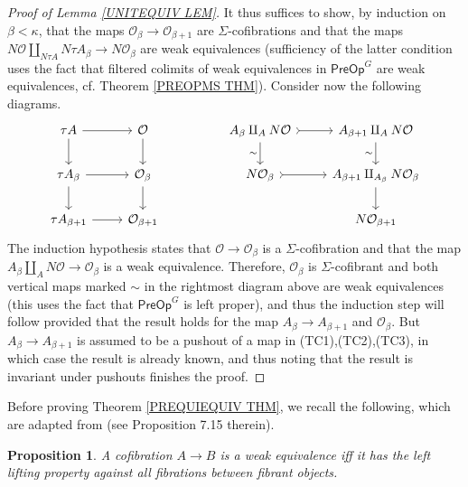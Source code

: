 \documentclass[a4paper,10pt
,draft
]{article}%
\numberwithin{equation}{section}
\numberwithin{figure}{section}
\newtheorem{proposition}[equation]{Proposition}%
\theoremstyle{definition} %
\newcommand{\1}{\ensuremath{\mathbbm 1}}%
\begin{document}
\begin{proof}[Proof of Lemma \ref{UNITEQUIV LEM}]
	It thus suffices to show, by induction on $\beta < \kappa$, 
	that the maps $\mathcal{O}_{\beta} \to \mathcal{O}_{\beta + 1}$ are $\Sigma$-cofibrations and that the maps 
	$N \mathcal{O} \amalg_{N \tau A} N \tau A_{\beta}
	\to 
	N \mathcal{O}_{\beta}$
	are weak equivalences
	(sufficiency of the latter condition uses the fact that 
	filtered colimits of weak equivalences in $\mathsf{PreOp}^G$ are weak equivalences, cf. Theorem \ref{PREOPMS THM}).
	Consider now the following diagrams.
	\[
	\begin{tikzcd}
	\tau A \ar{r} \ar{d} & \mathcal{O} \ar{d}
	&&
	A_{\beta} \amalg_{A} N \mathcal{O}
	\ar[>->]{r} \ar{d}[swap]{\sim} &
	A_{\beta+1} \amalg_{A} N \mathcal{O}
	\ar{d}[swap]{\sim}
	\\
	\tau A_{\beta} \ar{r} \ar{d} & \mathcal{O}_{\beta} \ar{d}
	&&
	N \mathcal{O}_{\beta} \ar[>->]{r} &
	A_{\beta+1} \amalg_{A_{\beta}} N \mathcal{O}_{\beta} \ar{d}
	\\
	\tau A_{\beta + 1} \ar{r} & \mathcal{O}_{\beta + 1}
	&&
	&
	N \mathcal{O}_{\beta+1}
	\end{tikzcd}
	\]
	The induction hypothesis states that
	$\mathcal{O} \to \mathcal{O}_{\beta}$ is a $\Sigma$-cofibration and that the map
	$A_{\beta} \amalg_A N \mathcal{O} \to \mathcal{O}_{\beta}$ is a weak equivalence.
	Therefore, $\mathcal{O}_{\beta}$ is $\Sigma$-cofibrant 
	and both vertical maps marked $\sim$ in the rightmost diagram above are weak equivalences 
	(this uses the fact that $\mathsf{PreOp}^G$ is left proper),
	and thus the induction step will follow provided that the result holds for
	the map $A_{\beta} \to A_{\beta + 1}$ and $\mathcal{O}_{\beta}$.
	But $A_{\beta} \to A_{\beta + 1}$ is assumed to be a pushout of a map in (TC1),(TC2),(TC3), 
	in which case the result is already known, and thus noting that the result is invariant under pushouts finishes the proof.
\end{proof}




Before proving Theorem \ref{PREQUIEQUIV THM}, 
we recall the following,
which are adapted from \cite{JT07} (see Proposition 7.15 therein). 


\begin{proposition}
	A cofibration $A \to B$ is a weak equivalence iff it has the left lifting property against all fibrations between fibrant objects.
\end{proposition}
\end{document}
